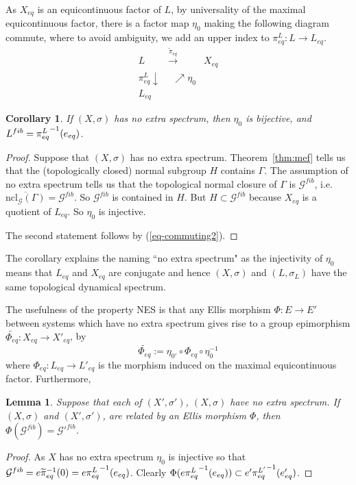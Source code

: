 \documentclass[10pt,a4paper]{amsart}
\newtheorem{lemma}[theorem]{Lemma}
\newtheorem{cor}[theorem]{Corollary}
\numberwithin{equation}{section}
\newcommand{\Gg}{{\mathcal G}}
\newcommand{\Xe}{X_{eq}}
\newcommand{\pe}{\pi_{eq}}
\newcommand{\tPhe}{\widetilde{\Phi_{eq}}}
\begin{document}
As $ \Xe$ is an equicontinuous factor of $L$, by universality of the maximal equicontinuous factor, there is a factor map $\eta_0$ making the following diagram commute, where to avoid ambiguity, we add an upper index to $\pe^L:L\rightarrow L_{eq}$.
\begin{equation}\label{eq-commuting2}
\begin{matrix}
L & \stackrel{\widetilde\pe}\to \,\, &\!\! \Xe \\
\!\!\!\pe^L  \downarrow & \:\:\nearrow \eta_0\!\! &  \\
L_{eq}  & & 
\end{matrix}
\end{equation}
 



\begin{cor}\label{cor:NES-equiv} If $(X,\sigma)$ has no extra spectrum, then $\eta_0$ is bijective, and $L^{fib} = {\pe^L}^{-1}(\ol)$.
\end{cor}
\begin{proof}
Suppose that $(X,\sigma)$ has no extra spectrum. Theorem~\ref{thm:mef} tells us that the (topologically closed) normal subgroup $H$ contains $\Gamma$.
 The assumption of no extra spectrum tells us  that the topological normal closure of $\Gamma$ is $\Gg^{fib}$, 
 i.e.\ $\overline{\text{ncl}_{\Gg}(\Gamma)} = \Gg^{fib}$.
 So $\Gg^{fib}$ is contained in $H$. But $H \subset \Gg^{fib}$ because $\Xe$ is a quotient of  $L_{eq}$.
  So $\eta_0$ is injective.
 
  
The second statement follows by (\ref{eq-commuting2}). 
\end{proof}
The corollary explains the naming ``no extra spectrum" as the injectivity of $\eta_0$ means that $L_{eq}$ and $\Xe$ are conjugate and hence $(X,\sigma)$ and $(L,\sigma_L)$ have the same 
topological dynamical spectrum. 

The usefulness of the property NES is that any Ellis morphism $\Phi:E\to E'$ between systems which have no extra spectrum gives rise to a group epimorphism  $\tPhe : \Xe \rightarrow X'_{eq}$, by
$$\tPhe := \eta_{0'}\circ \Phi_{eq} \circ \eta_0^{-1}$$
where $\Phi_{eq}:L_{eq}\to L'_{eq}$ is the morphism induced on the maximal equicontinuous factor. Furthermore,
\begin{lemma}\label{lem-fibs}
Suppose that each of $(X',\sigma')$, $(X,\sigma)$   have no extra spectrum. If 
 $(X,\sigma)$ and  $(X',\sigma')$, are related by an Ellis morphism $\Phi$,
 then $\Phi (\Gg^{fib})={\Gg'}^{fib}$. 
 \end{lemma}
\begin{proof}
As $X$ has no extra spectrum $\eta_0$ is injective so that $\Gg^{fib} = e\widetilde\pe^{-1}(0)=e{\pe^L}^{-1}(\ol)$. 
Clearly $\Phi(e{\pe^L}^{-1}(\ol)) \subset  e' {\pe^{L'}}^{-1}(\ol')$. 
\end{proof}
\end{document}
